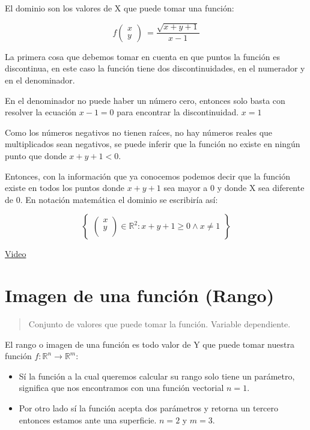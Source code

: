 \documentclass[11pt]{article}
\begin{document}
El dominio son los valores de X que puede tomar una función:

\begin{DEMONSTRATION}
\[ f \begin{pmatrix} x \\ y \end{pmatrix} \ = \frac{ \sqrt{x+y+1} }{x - 1} \]
\end{DEMONSTRATION}

La primera cosa que debemos tomar en cuenta en que puntos la función es discontinua, en este caso la función tiene dos discontinuidades, en el numerador y en el denominador. 

En el denominador no puede haber un número cero, entonces solo basta con resolver la ecuación \(x-1 = 0\) para encontrar la discontinuidad. \(x = 1\)

Como los números negativos no tienen raíces, no hay números reales que multiplicados sean negativos, se puede inferir que la función no existe en ningún punto que donde \(x+y+1 < 0\).

Entonces, con la información que ya conocemos podemos decir que la función existe en todos los puntos donde \(x+y+1\) sea mayor a 0 y donde X sea diferente de 0. En notación matemática el dominio se escribiría así:

\begin{DEMONSTRATION}
\[ \begin{Bmatrix}
  \begin{pmatrix} 
  x \\ y \\ 
  \end{pmatrix} \in \mathbb R^2: 
  x + y + 1 \geq 0 \wedge x \not = 1
\end{Bmatrix}  \]
\end{DEMONSTRATION}

\href{https://youtu.be/qDr0R7hIjts}{Video}

\section{Imagen de una función (Rango)}
\label{sec:orgc29eaf4}
\begin{quote}
Conjunto de valores que puede tomar la función.
Variable dependiente.
\end{quote}

El rango o imagen de una función es todo valor de Y que puede tomar nuestra función \(f: \mathbb R^n \to \mathbb R^m\):

\begin{itemize}
\item Sí la función a la cual queremos calcular su rango solo tiene un parámetro, significa que nos encontramos con una función vectorial \(n = 1\).

\item Por otro lado sí la función acepta dos parámetros y retorna un tercero entonces estamos ante una superficie. \(n = 2\) y \(m = 3\).
\end{itemize}
\end{document}
